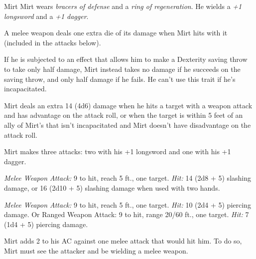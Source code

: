 \documentclass[10pt,a4paper,twoside,bg=print,twocolumn,openany,nodeprecatedcode]{dndbook}
\begin{document}
\begin{DndMonster}[float=t]{Mirt}
\DndMonsterBasics[
armor-class = {16 (\textit{bracers of defense})},
hit-points = {\DndDice{18d8 + 72}},
speed = {30 ft.}
]
\DndMonsterAbilityScores[
 str = 18,
 dex = 18,
 con = 18,
 int = 15,
 wis = 12,
 cha = 15
]
\DndMonsterDetails[
saving-throws = {Dex +8, Wis +5},
skills = {Acrobatics +8, Athletics +8, Perception +5, Persuasion +6, Stealth +8},
languages = {Common, Dwarvish},
challenge = 9,
]
Mirt wears \textit{bracers of defense} and a \textit{ring of regeneration}. He wields a \textit{+1 longsword} and a \textit{+1 dagger}.

A melee weapon deals one extra die of its damage when Mirt hits with it (included in the attacks below).

If he is subjected to an effect that allows him to make a Dexterity saving throw to take only half damage, Mirt instead takes no damage if he succeeds on the saving throw, and only half damage if he fails. He can't use this trait if he's incapacitated.

Mirt deals an extra 14 (4d6) damage when he hits a target with a weapon attack and has advantage on the attack roll, or when the target is within 5 feet of an ally of Mirt's that isn't incapacitated and Mirt doesn't have disadvantage on the attack roll.

Mirt makes three attacks: two with his +1 longsword and one with his +1 dagger.

\textsl{Melee Weapon Attack:} 9 to hit, reach 5 ft., one target. \textsl{Hit:} 14 (2d8 + 5) slashing damage, or 16 (2d10 + 5) slashing damage when used with two hands.

\textsl{Melee Weapon Attack:} 9 to hit, reach 5 ft., one target. \textsl{Hit:} 10 (2d4 + 5) piercing damage. Or Ranged Weapon Attack: 9 to hit, range 20/60 ft., one target. \textsl{Hit:} 7 (1d4 + 5) piercing damage.

Mirt adds 2 to his AC against one melee attack that would hit him. To do so, Mirt must see the attacker and be wielding a melee weapon.

\end{DndMonster}
\end{document}
